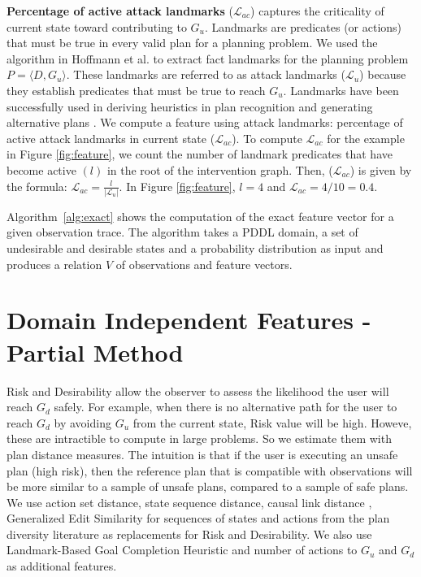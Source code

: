 \textbf{Percentage of active attack landmarks} ($\mathcal{L}_{ac}$) captures the criticality of current state toward contributing to $G_u$. Landmarks \cite{hoffman2004lm} are predicates (or actions) that must be true in every valid plan for a planning problem. We used the algorithm in Hoffmann et al.  to extract fact landmarks for the planning problem $P = \langle D, G_u\rangle$. These landmarks are referred to as attack landmarks ($\mathcal{L}_{u}$) because they establish predicates that must be true to reach $G_u$.  Landmarks have been successfully used in deriving heuristics in plan recognition \cite{vered2018goalrec} and generating alternative plans \cite{bryce2014diverse}. We compute a feature using attack landmarks: percentage of active attack landmarks in current state ($\mathcal{L}_{ac}$). To compute $\mathcal{L}_{ac}$ for the example in Figure \ref{fig:feature}, we count the number of landmark predicates that have become active $(l)$ in the root of the intervention graph. Then, ($\mathcal{L}_{ac}$) is given by the formula: $\mathcal{L}_{ac} = \frac{l}{\left |\mathcal{L}_{u}\right|}$. In Figure \ref{fig:feature}, $l=4$ and $\mathcal{L}_{ac}=4/10=0.4$.

Algorithm~\ref{alg:exact} shows the computation of the exact feature vector for a given observation trace. The algorithm takes a PDDL domain, a set of undesirable and desirable states and a probability distribution as input and produces a relation $V$ of observations and feature vectors.

\section{Domain Independent Features - Partial Method} Risk and Desirability allow the observer to assess the likelihood the user will reach $G_d$ safely. For example, when there is no alternative path for the user to reach $G_d$ by avoiding $G_u$ from the current state, Risk value will be high. Howeve, these are intractible to compute in large problems. So we estimate them with plan distance measures. The intuition is that if the user is executing an unsafe plan (high risk), then the reference plan that is compatible with observations will be more similar to a sample of unsafe plans, compared to a sample of safe plans. We use action set distance, state sequence distance, causal link distance \cite{nguyen2012generating}, Generalized Edit Similarity for sequences of states and actions \cite{sohrabi2016finding} from the plan diversity literature as replacements for Risk and Desirability. We also use Landmark-Based Goal Completion Heuristic \cite{pereira2017} and number of actions to $G_u$ and $G_d$ as additional features.

